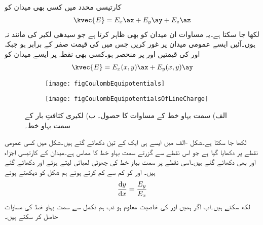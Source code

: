 کارتیسی محدد میں کسی بھی میدان کو
\begin{align*}
\kvec{E}=E_x\ax+E_y\ay+E_z\az
\end{align*}
لکھا جا سکتا ہے۔یہ مساوات ان میدان کو بھی ظاہر کرتا ہے جو سیدھی لکیر کی مانند نہ ہوں۔آئیں ایسے عمومی میدان پر غور کریں جس میں  کی قیمت صفر کے برابر ہو جبکہ  اور  کی قیمتیں  اور  پر منحصر ہو۔کسی بھی نقطہ  پر ایسے میدان کو
\begin{align}\label{مساوات_کولمب_عمومی_کارتیسی_میدان}
\kvec{E}=E_x(x,y)\ax+E_y(x,y)\ay
\end{align}
%
\begin{figure}
\centering
\begin{subfigure}{0.5\textwidth}
\centering
\texttt{[image: figCoulombEquipotentials]}
\end{subfigure}%
%
\begin{subfigure}{0.5\textwidth}
\centering
\texttt{[image: figCoulombEquipotentialsOfLineCharge]}
\end{subfigure}%
\caption{الف) سمت بہاو خط کے مساوات کا حصول۔ ب) لکیری کثافتِ بار کے سمت بہاو خط۔}
\label{شکل_کولمب_سمت_بہاو_خط}
\end{figure}
لکھا  جا سکتا ہے۔شکل -الف میں ایسے ہی ایک  کے تین  دکھائے گئے ہیں۔شکل میں کسی عمومی نقطے پر  دکھایا گیا ہے جو اس نقطے سے  گزرتے سمت بہاو خط کا مماس ہے۔میدان کے کارتیسی اجزاء  اور  بھی دکھائے گئے ہیں۔اسی نقطے پر سمت بہاو خط کی چھوٹی لمبائی لیتے ہوئے  اور  دکھائے گئے ہیں۔ اور   کو کم سے کم کرتے ہوئے ہم شکل کو دیکھتے ہوئے
\begin{align}\label{مساوات_کولمب_سمت_بہاو_کارتیسی}
\frac{\dif y}{\dif x}=\frac{E_y}{E_x}
\end{align}
لکھ سکتے ہیں۔اب اگر ہمیں  اور  کی خاصیت معلوم ہو تب ہم تکمل سے سمت بہاو خط کی مساوات حاصل کر سکتے ہیں۔

